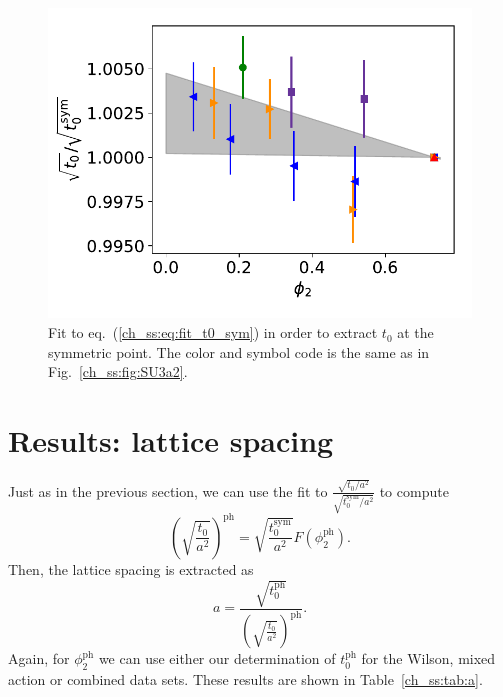 \begin{figure}
    \centering
    \includegraphics[width=.7\textwidth]{./cap5/figs/t0_sym.pdf}
    \caption{Fit to eq.~(\ref{ch_ss:eq:fit_t0_sym}) in order to extract $t_0$ at the symmetric point. The color and symbol code is the same as in Fig.~\ref{ch_ss:fig:SU3a2}.}
    \label{ch_ss:fig:t0_sym}
\end{figure}

\section{Results: lattice spacing}

Just as in the previous section, we can use the fit to $\frac{\sqrt{t_0/a^2}}{\sqrt{t_0^{\textrm{sym}}/a^2}}$ to compute 
\begin{equation}
\left(\sqrt{\frac{t_0}{a^2}}\right)^{\textrm{ph}}=\sqrt{\frac{t_0^{\textrm{sym}}}{a^2}}F(\phi_2^{\textrm{ph}}).
\end{equation}
Then, the lattice spacing is extracted as
\begin{equation}
\label{ch_ss:eq:a}
a=\frac{\sqrt{t_0^{\textrm{ph}}}}{\left(\sqrt{\frac{t_0}{a^2}}\right)^{\textrm{ph}}}.
\end{equation}
Again, for $\phi_2^{\textrm{ph}}$ we can use either our determination of $t_0^{\textrm{ph}}$ for the Wilson, mixed action or combined data sets. These results are shown in Table~\ref{ch_ss:tab:a}.


